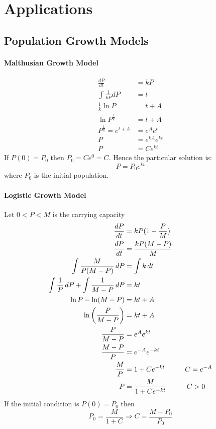 \documentclass[12pt]{article}
\newcommand\tab[1][1cm]{\hspace*{#1}}
\begin{document}
\section{Applications}
\subsection{Population Growth Models}
\paragraph{Malthusian Growth Model}
\begin{align*} 
    \frac{dP}{dt} &= kP \\
    \int \frac{1}{kP} dP &= t \\
    \frac{1}{k} \ln P &= t + A \\
    \ln P^{\frac{1}{k}} &= t + A \\
    P^{\frac{1}{k}} = e^{t + A} &= e^Ae^t \\
    P &= e^{kA}e^{kt} \\
    P &= Ce^{kt}
\end{align*}
If $P(0) = P_0$ then $P_0 = Ce^0 = C$. Hence the particular solution is:
\[
    P = P_0e^{kt}
\]
where $P_0$ is the initial population.

\paragraph{Logistic Growth Model}
Let $0 < P < M$ is the carrying capacity
\begin{align*} 
    \frac{dP}{dt} &= kP(1 - \frac{P}{M}) \\
    \frac{dP}{dt} &= \frac{kP(M - P)}{M} \\
    \int \frac{M}{P(M - P)} \, dP &= \int k \, dt \\
    \int \frac{1}{P} \, dP + \int \frac{1}{M - P} \, dP &= kt \\
    \ln P - \ln (M - P) &= kt + A \\
    \ln \left( \frac{P}{M - P}\right) &= kt + A \\
    \frac{P}{M - P} &= e^Ae^{kt} \\
    \frac{M - P}{P} &= e^{ - A}e^{ - kt} \\ 
    \frac{M}{P} &= 1 + Ce^{ - kt} \textrm{\tab} C = e^{-A} \\
    P &= \frac{M}{1 + Ce^{ - kt}} \textrm{\tab} C > 0
\end{align*}
If the initial condition is $P(0) = P_0$ then 
\[
    P_0 = \frac{M}{1 + C} \Rightarrow C = \frac{M - P_0}{P_0} 
\]
\end{document}
